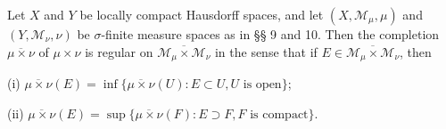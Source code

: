 Let $X$ and $Y$ be locally compact Hausdorff spaces, and let $(X, \mathcal{M}_\mu, \mu)$ and $(Y, \mathcal{M}_\nu, \nu)$ be $\sigma$-finite measure spaces as in §§ 9 and 10. Then the completion $\overline{\mu \times \nu}$ of $\mu \times \nu$ is regular on $\overline{\mathcal{M}_\mu \times \mathcal{M}_\nu}$ in the sense that if $E \in \overline{\mathcal{M}_\mu \times \mathcal{M}_\nu}$, then

(i) $\overline{\mu \times \nu}(E) = \inf\{\overline{\mu \times \nu}(U): E \subset U, U \text{ is open}\}$;

(ii) $\overline{\mu \times \nu}(E) = \sup\{\overline{\mu \times \nu}(F): E \supset F, F \text{ is compact}\}$.
